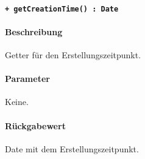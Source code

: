 \paragraph{\texttt{+ getCreationTime() : Date}}\label{AP_ChangeAction_getCreationTime}%
\paragraph*{Beschreibung}
Getter für den Erstellungszeitpunkt.
\paragraph*{Parameter}
Keine.
\paragraph*{Rückgabewert}
Date mit dem Erstellungszeitpunkt.